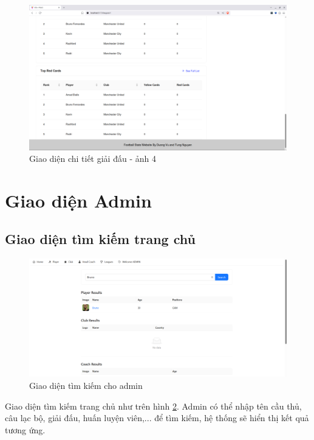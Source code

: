 \documentclass[../BTL.tex]{subfiles}
\begin{document}
\begin{figure}
    \centering
    \includegraphics[width=1\linewidth]{Hinhve/user-league-season4.png}
    \caption{ Giao diện chi tiết giải đấu - ảnh 4}
    \label{fig:user-league-season4}
\end{figure}
\section{ Giao diện Admin}
\subsection{Giao diện tìm kiếm trang chủ}
\begin{figure}
    \centering
    \includegraphics[width=1\linewidth]{Hinhve/search_home.png}
    \caption{Giao diện tìm kiếm cho admin}
    \label{fig:search_home}
\end{figure}
Giao diện tìm kiếm trang chủ như trên hình \ref{fig:search_home}. Admin có thể nhập tên cầu thủ, câu lạc bộ, giải đấu, huấn luyện viên,... để tìm kiếm, hệ thống sẽ hiển thị kết quả tương ứng.
\end{document}
